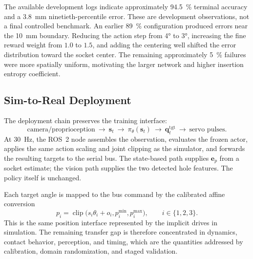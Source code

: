 The available development logs indicate approximately \SI{94.5}{\percent} terminal accuracy and a \SI{3.8}{\milli\meter} ninetieth-percentile error. These are development observations, not a final controlled benchmark. An earlier \SI{89}{\percent} configuration produced errors near the \SI{10}{\milli\meter} boundary. Reducing the action step from \ang{4} to \ang{3}, increasing the fine reward weight from $1.0$ to $1.5$, and adding the centering well shifted the error distribution toward the socket center. The remaining approximately \SI{5}{\percent} failures were more spatially uniform, motivating the larger network and higher insertion entropy coefficient.

\rlFloatBarrier

\subsection{Sim-to-Real Deployment}\label{rl:sec:rl-sim2real}

The deployment chain preserves the training interface:
\begin{equation*}
\text{camera/proprioception}\ \longrightarrow\ \bm s_t\ \longrightarrow\ \pi_\theta(\bm s_t)\ \longrightarrow\ \bm q_t^{\mathrm{tgt}}\ \longrightarrow\ \text{servo pulses}.
\end{equation*}
At \SI{30}{\hertz}, the ROS~2 node assembles the observation, evaluates the frozen actor, applies the same action scaling and joint clipping as the simulator, and forwards the resulting targets to the serial bus. The state-based path supplies $\bm e_p$ from a socket estimate; the vision path supplies the two detected hole features. The policy itself is unchanged.

Each target angle is mapped to the bus command by the calibrated affine conversion
\begin{equation}
p_i=\operatorname{clip}\!\big(s_i\theta_i+o_i,p_i^{\min},p_i^{\max}\big),\qquad i\in\{1,2,3\}.
\label{rl:eq:rl-pulse}
\end{equation}
This is the same position interface represented by the implicit drives in simulation. The remaining transfer gap is therefore concentrated in dynamics, contact behavior, perception, and timing, which are the quantities addressed by calibration, domain randomization, and staged validation.

